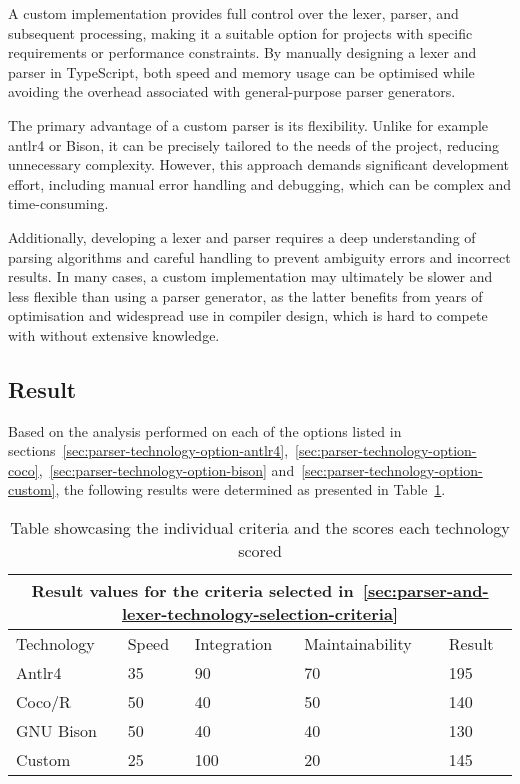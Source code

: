 A custom implementation provides full control over the lexer, parser, and subsequent processing, making it a suitable option for projects with specific requirements or performance constraints. By manually designing a lexer and parser in TypeScript, both speed and memory usage can be optimised while avoiding the overhead associated with general-purpose parser generators.

The primary advantage of a custom parser is its flexibility. Unlike for example \Gls{antlr4} or Bison, it can be precisely tailored to the needs of the project, reducing unnecessary complexity. However, this approach demands significant development effort, including manual error handling and debugging, which can be complex and time-consuming.

Additionally, developing a lexer and parser requires a deep understanding of parsing algorithms and careful handling to prevent ambiguity errors and incorrect results. In many cases, a custom implementation may ultimately be slower and less flexible than using a parser generator, as the latter benefits from years of optimisation and widespread use in compiler design, which is hard to compete with without extensive knowledge.

\subsection{Result}

Based on the analysis performed on each of the options listed in sections~\ref{sec:parser-technology-option-antlr4},~\ref{sec:parser-technology-option-coco},~\ref{sec:parser-technology-option-bison} and~\ref{sec:parser-technology-option-custom}, the following results were determined as presented in Table~\ref{tab:parser-and-lexer-technology-results}.

\begin{table}[H]
	\centering
	\begin{tabular}{ |p{3.2cm}|p{2.8cm}|p{2.8cm}|p{2.8cm}|p{1.6cm}|  }
		\hline
		\multicolumn{5}{|c|}{Result values for the criteria selected in~\ref{sec:parser-and-lexer-technology-selection-criteria}} \\
		\hline
		Technology&Speed&Integration&Maintainability&Result\\
		\hline
		Antlr4&35&90&70&195\\
		Coco/R&50&40&50&140\\
		GNU Bison&50&40&40&130\\
		Custom&25&100&20&145\\
		\hline
	\end{tabular}
	\caption{Table showcasing the individual criteria and the scores each technology scored}
	\label{tab:parser-and-lexer-technology-results}
\end{table}

